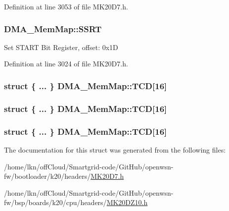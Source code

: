 Definition at line 3053 of file M\+K20\+D7.\+h.

\subsubsection[{\texorpdfstring{S\+S\+RT}{SSRT}}]{ D\+M\+A\+\_\+\+Mem\+Map\+::\+S\+S\+RT}\hypertarget{struct_d_m_a___mem_map_a39ea12b8e20431f54f8c6ba9f08bfc1b}{}\label{struct_d_m_a___mem_map_a39ea12b8e20431f54f8c6ba9f08bfc1b}
Set S\+T\+A\+RT Bit Register, offset\+: 0x1D 

Definition at line 3024 of file M\+K20\+D7.\+h.

\subsubsection[{\texorpdfstring{T\+CD}{TCD}}]{\setlength{\rightskip}{0pt plus 5cm}struct \{ ... \}   D\+M\+A\+\_\+\+Mem\+Map\+::\+T\+CD\mbox{[}16\mbox{]}}\hypertarget{struct_d_m_a___mem_map_a65361a02a2acedf7c9ce50968b7d7da8}{}\label{struct_d_m_a___mem_map_a65361a02a2acedf7c9ce50968b7d7da8}
\subsubsection[{\texorpdfstring{T\+CD}{TCD}}]{\setlength{\rightskip}{0pt plus 5cm}struct \{ ... \}   D\+M\+A\+\_\+\+Mem\+Map\+::\+T\+CD\mbox{[}16\mbox{]}}\hypertarget{struct_d_m_a___mem_map_aa9ecddfb548d672ff9426f166ac86709}{}\label{struct_d_m_a___mem_map_aa9ecddfb548d672ff9426f166ac86709}
\subsubsection[{\texorpdfstring{T\+CD}{TCD}}]{\setlength{\rightskip}{0pt plus 5cm}struct \{ ... \}   D\+M\+A\+\_\+\+Mem\+Map\+::\+T\+CD\mbox{[}16\mbox{]}}\hypertarget{struct_d_m_a___mem_map_a4c6dc939894da03763acff98bd17fa1c}{}\label{struct_d_m_a___mem_map_a4c6dc939894da03763acff98bd17fa1c}


The documentation for this struct was generated from the following files\+:\begin{DoxyCompactItemize}
\item 
/home/lkn/off\+Cloud/\+Smartgrid-\/code/\+Git\+Hub/openwsn-\/fw/bootloader/k20/headers/\hyperlink{bootloader_2k20_2headers_2_m_k20_d7_8h}{M\+K20\+D7.\+h}\item 
/home/lkn/off\+Cloud/\+Smartgrid-\/code/\+Git\+Hub/openwsn-\/fw/bsp/boards/k20/cpu/headers/\hyperlink{_m_k20_d_z10_8h}{M\+K20\+D\+Z10.\+h}\end{DoxyCompactItemize}
